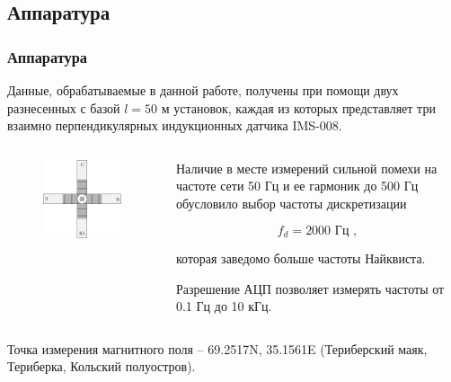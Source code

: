 \documentclass[10pt,pdf,hyperref={unicode}, dvipsnames]{beamer}
\newcommand\frametitless[1]{\subsection{#1}\frametitle{#1}}
\begin{document}
\begin{frame}[t]
	\frametitless{Аппаратура}
	Данные, обрабатываемые в данной работе, получены при помощи двух разнесенных с базой $l=50$ м установок, каждая из которых представляет три взаимно перпендикулярных индукционных датчика IMS-008.

	\begin{columns}
		\begin{column}{0.49\textwidth}
			\begin{figure}[h]
				\centering
				\includegraphics[scale=0.8]
				{images/us}
			\end{figure}	
		\end{column}
		\begin{column}{0.49\textwidth}

			Наличие в месте измерений сильной помехи на частоте сети 50 Гц и ее гармоник до 500 Гц обусловило выбор частоты дискретизации

			\begin{equation*}
				f_d=2000 \text{ Гц },
			\end{equation*}

			которая заведомо больше частоты Найквиста.

			\vspace{1em}
			Разрешение АЦП позволяет измерять частоты от 0.1 Гц до 10 кГц.
		\end{column}
	\end{columns}
	\vspace{1em}
	Точка измерения магнитного поля -- 69.2517N, 35.1561E (Териберский маяк, Териберка, Кольский полуостров).

\end{frame}
\end{document}
